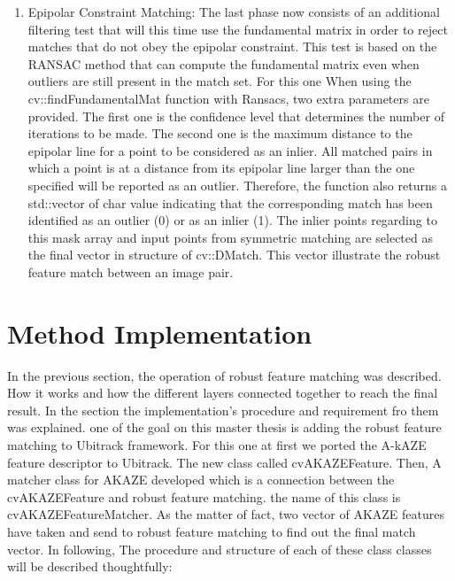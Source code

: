 \begin {enumerate}
  \item Epipolar Constraint Matching: The last phase now consists of an additional filtering test that will this time use the fundamental matrix in order to reject matches that do not obey the epipolar constraint. This test is based on the RANSAC method that can compute the fundamental matrix even when outliers are still present in the match set. For this one When using the cv::findFundamentalMat function with Ransacs, two extra parameters are provided. The first one is the confidence level that determines the number of iterations to be made. The second one is the maximum distance to the epipolar line for a point to be considered as an inlier. All matched pairs in which a point is at a distance from its epipolar line larger than the one specified will be reported as an outlier. Therefore, the function also returns a std::vector of char value indicating that the corresponding match has been identified as an outlier (0) or as an inlier (1). The inlier points regarding to this mask array and input points from symmetric matching are selected as the final vector in structure of cv::DMatch. This vector illustrate the robust feature match between an image pair.
\end {enumerate}

\section {Method Implementation}
In the previous section, the operation of robust feature matching was described. How it works and how the different layers connected together to reach the final result. In the section the implementation's procedure and requirement fro them was explained. one of the goal on this master thesis is adding the robust feature matching to Ubitrack framework. For this one at first we ported the A-kAZE feature descriptor to Ubitrack. The new class called cvAKAZEFeature. Then, A matcher class for AKAZE developed which is a connection between the cvAKAZEFeature and robust feature matching. the name of this class is cvAKAZEFeatureMatcher. As the matter of fact, two vector of AKAZE features have taken and send to robust feature matching to find out the final match vector. In following, The procedure and structure of each of these class classes will be described thoughtfully:

